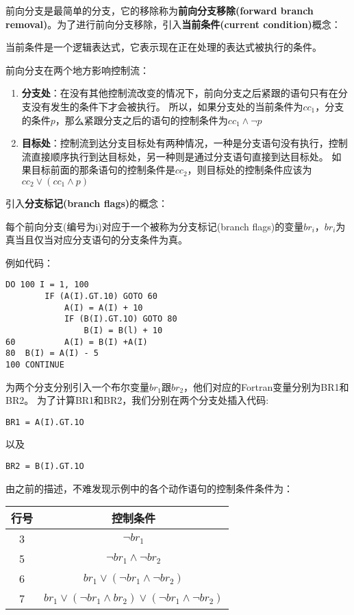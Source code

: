 前向分支是最简单的分支，它的移除称为\textbf{前向分支移除(forward branch removal)}。为了进行前向分支移除，引入\textbf{当前条件(current condition)}概念：

\begin{definition}
当前条件是一个逻辑表达式，它表示现在正在处理的表达式被执行的条件。
\end{definition}

前向分支在两个地方影响控制流：

\begin{enumerate}
\item \textbf{分支处}：在没有其他控制流改变的情况下，前向分支之后紧跟的语句只有在分支没有发生的条件下才会被执行。
所以，如果分支处的当前条件为$cc_1$，分支的条件$p$，那么紧跟分支之后的语句的控制条件为$cc_1\wedge \neg p$
\item \textbf{目标处}：控制流到达分支目标处有两种情况，一种是分支语句没有执行，控制流直接顺序执行到达目标处，另一种则是通过分支语句直接到达目标处。
如果目标前面的那条语句的控制条件是$cc_2$，则目标处的控制条件应该为$cc_2\vee \left(cc_1\wedge p\right)$
\end{enumerate}

引入\textbf{分支标记(branch flags)}的概念：

\begin{definition}
每个前向分支(编号为i)对应于一个被称为分支标记(branch flags)的变量$br_i$，$br_i$为真当且仅当对应分支语句的分支条件为真。
\end{definition}

例如代码：

\begin{lstlisting}[language=FORTRAN]
	DO 100 I = 1, 100
		IF (A(I).GT.10) GOTO 60
			A(I) = A(I) + 10
			IF (B(I).GT.1O) GOTO 80
				B(I) = B(l) + 10
60			A(I) = B(I) +A(I)
80	B(I) = A(I) - 5
100	CONTINUE 
\end{lstlisting}

为两个分支分别引入一个布尔变量$br_1$跟$br_2$，他们对应的Fortran变量分别为BR1和BR2。
为了计算BR1和BR2，我们分别在两个分支处插入代码:
\begin{lstlisting}[language=FORTRAN]
BR1 = A(I).GT.1O
\end{lstlisting}
以及
\begin{lstlisting}[language=FORTRAN]
BR2 = B(I).GT.1O
\end{lstlisting}

由之前的描述，不难发现示例中的各个动作语句的控制条件条件为：

\begin{tabular}{|c|c|}
\hline
行号	&	控制条件																					\\
\hline
3	&	$\neg br_1$																				\\
5	&	$\neg br_1 \wedge\neg br_2$																\\
6	&	$br_1\vee\left(\neg br_1 \wedge\neg br_2\right)$										\\
7	&	$br_1\vee\left(\neg br_1 \wedge br_2\right)\vee\left(\neg br_1 \wedge\neg br_2\right)$	\\
\hline
\end{tabular}

